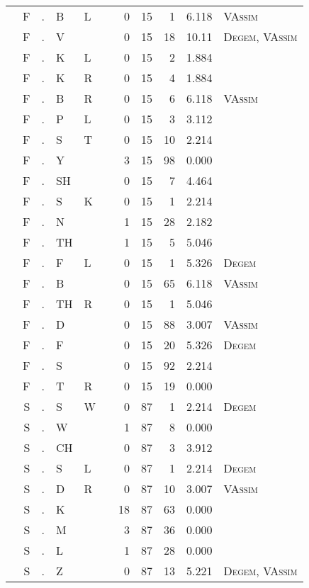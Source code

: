 \begin{longtable}{r@{ } r@{ } c@{ } l@{ } l@{ } l@{ } r r r r l }
 & F & . & B & L &  & 0 & 15 & 1 & 6.118 & \textsc{VAssim} \\
 & F & . & V &  &  & 0 & 15 & 18 & 10.11 & \textsc{Degem}, \textsc{VAssim} \\
 & F & . & K & L &  & 0 & 15 & 2 & 1.884 &  \\
 & F & . & K & R &  & 0 & 15 & 4 & 1.884 &  \\
 & F & . & B & R &  & 0 & 15 & 6 & 6.118 & \textsc{VAssim} \\
 & F & . & P & L &  & 0 & 15 & 3 & 3.112 &  \\
 & F & . & S & T &  & 0 & 15 & 10 & 2.214 &  \\
 & F & . & Y &  &  & 3 & 15 & 98 & 0.000 &  \\
 & F & . & SH &  &  & 0 & 15 & 7 & 4.464 &  \\
 & F & . & S & K &  & 0 & 15 & 1 & 2.214 &  \\
 & F & . & N &  &  & 1 & 15 & 28 & 2.182 &  \\
 & F & . & TH &  &  & 1 & 15 & 5 & 5.046 &  \\
 & F & . & F & L &  & 0 & 15 & 1 & 5.326 & \textsc{Degem} \\
 & F & . & B &  &  & 0 & 15 & 65 & 6.118 & \textsc{VAssim} \\
 & F & . & TH & R &  & 0 & 15 & 1 & 5.046 &  \\
 & F & . & D &  &  & 0 & 15 & 88 & 3.007 & \textsc{VAssim} \\
 & F & . & F &  &  & 0 & 15 & 20 & 5.326 & \textsc{Degem} \\
 & F & . & S &  &  & 0 & 15 & 92 & 2.214 &  \\
 & F & . & T & R &  & 0 & 15 & 19 & 0.000 &  \\
 & S & . & S & W &  & 0 & 87 & 1 & 2.214 & \textsc{Degem} \\
 & S & . & W &  &  & 1 & 87 & 8 & 0.000 &  \\
 & S & . & CH &  &  & 0 & 87 & 3 & 3.912 &  \\
 & S & . & S & L &  & 0 & 87 & 1 & 2.214 & \textsc{Degem} \\
 & S & . & D & R &  & 0 & 87 & 10 & 3.007 & \textsc{VAssim} \\
 & S & . & K &  &  & 18 & 87 & 63 & 0.000 &  \\
 & S & . & M &  &  & 3 & 87 & 36 & 0.000 &  \\
 & S & . & L &  &  & 1 & 87 & 28 & 0.000 &  \\
 & S & . & Z &  &  & 0 & 87 & 13 & 5.221 & \textsc{Degem}, \textsc{VAssim} \\

\end{longtable}
